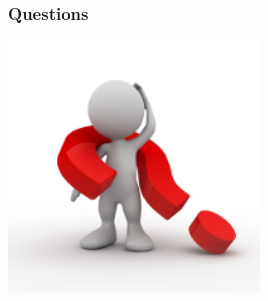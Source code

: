 \documentclass[10pt]{beamer}
\begin{document}
\begin{frame}
\frametitle{Questions}
\begin{center}
\includegraphics[width=0.5\textwidth]{pictures/questions.png}
\end{center}
\end{frame}
\end{document}
